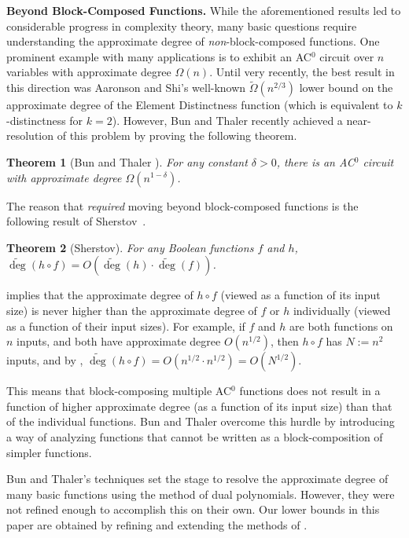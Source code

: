\documentclass[11pt, letterpaper, fleqn]{article}
\newtheorem{theorem}{Theorem}
\theoremstyle{plain}
\newcommand{\adeg}{\widetilde{\operatorname{deg}}}
\begin{document}
\medskip
 \noindent \textbf{Beyond Block-Composed Functions.}  While the aforementioned results
led to considerable progress in complexity theory,
 many basic questions require understanding the approximate degree
 of \emph{non}-block-composed functions. One prominent example with many
 applications is to exhibit an AC$^0$ circuit over $n$ variables with approximate degree $\Omega(n)$.
\label{op1sec}
Until very recently, the best result in this direction was Aaronson and Shi's well-known $\tilde{\Omega}(n^{2/3})$ lower bound on the approximate degree of the Element Distinctness function (which is equivalent to $k$-distinctness for $k=2$)\cite{aaronsonshi}. However, Bun and Thaler \cite{adegsurj} recently achieved a near-resolution of this problem by proving the following theorem.

\begin{theorem}[Bun and Thaler \cite{adegsurj}] \label{thm:mainthm} For any constant $\delta \!>\! 0$,
there is an AC$^0$ circuit with approximate degree $\Omega(n^{1-\delta})$. \end{theorem}

\noindent The reason that  \emph{required} moving beyond block-composed functions is the following result of Sherstov~\cite{sherstovrobust}.

\begin{theorem}[Sherstov] \label{thm:robust}
For any Boolean functions $f$ and $h$, $\adeg(h \circ f) = O\left(\adeg(h) \cdot \adeg(f)\right)$.
\end{theorem}

 implies that the approximate degree of $h \circ f$
(viewed as a function of its input size) is never higher than the approximate degree of
$f$ or $h$ individually (viewed as a function of their input sizes). For example, if $f$ and $h$ are both functions 
on $n$ inputs, and
both have approximate degree $O(n^{1/2})$, then $h \circ f$ has $N:=n^2$ inputs, and by , $\adeg(h \circ f) = O(n^{1/2} \cdot n^{1/2}) = O(N^{1/2})$.

This means that
block-composing multiple AC$^0$ functions does not result in a function of higher approximate degree (as a function of its input size) than that of the individual functions.
Bun and Thaler \cite{adegsurj} overcome
 this hurdle by introducing a way of analyzing functions that
 cannot be written as a block-composition of simpler functions.
 
 Bun and Thaler's techniques set the stage to resolve the approximate degree
 of many basic functions using the method of dual polynomials. However, they were not refined enough to accomplish this on their own. Our lower bounds in this paper
 are obtained by refining and extending the methods of \cite{adegsurj}. 
 
\end{document}
